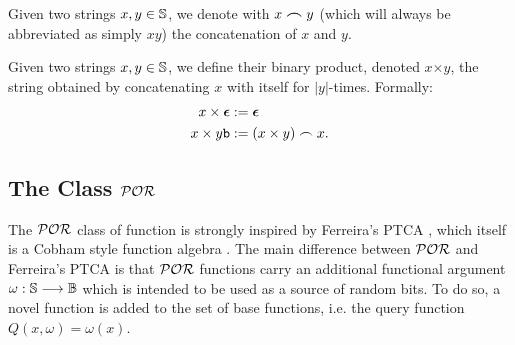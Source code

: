 \begin{defn}
  Given two strings $x,y \in \mathbb{S}$,
  we denote with
  $x\bm{\frown} y$ (which will always be
  abbreviated as simply $xy$)
  the concatenation of $x$ and $y$.
\end{defn}

\begin{defn}
  Given two strings $x,y \in \mathbb{S}$,
  we define their binary product,
  denoted $x\bm\times y$, the string
  obtained by concatenating
  $x$ with itself for $|y|$-times. Formally:
  \begin{align*}
    x \times \bm{\epsilon} &:= \bm{\epsilon}\\
    x \times y\mathtt{b} &:= (x\times y)\frown x.
  \end{align*}
\end{defn}

\subsection{The Class $\mathcal{POR}$}\label{sec:POR}

The $\mathcal{POR}$ class of function is strongly inspired by Ferreira's PTCA
\cite{Ferreira90}, which itself is a Cobham style function algebra \cite{Cobham1965}.
%
The main difference between $\mathcal{POR}$ and Ferreira's PTCA is that $\mathcal{POR}$
functions carry an additional functional argument $\omega: \mathbb{S} \longrightarrow \mathbb{B}$
which is intended to be used as a source of random bits. To do so, a novel function
is added to the set of base functions, i.e. the query function $Q(x, \omega)= \omega(x)$.

